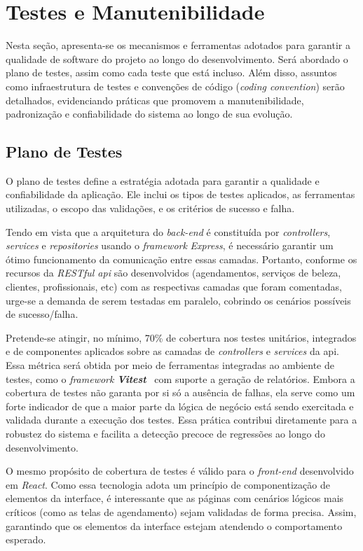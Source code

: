 \section{Testes e Manutenibilidade}
Nesta seção, apresenta-se os mecanismos e ferramentas adotados para garantir a qualidade de software do projeto ao longo do desenvolvimento.
Será abordado o plano de testes, assim como cada teste que está incluso. Além disso, assuntos como infraestrutura de testes e convenções de código (\textit{coding convention})
serão detalhados, evidenciando práticas que promovem a manutenibilidade, padronização e confiabilidade do sistema ao longo de sua evolução.

\subsection{Plano de Testes}
O plano de testes define a estratégia adotada para garantir a qualidade e confiabilidade da aplicação. 
Ele inclui os tipos de testes aplicados, as ferramentas utilizadas, o escopo das validações, e os critérios de sucesso e falha.

Tendo em vista que a arquitetura do \textit{back-end} é constituída por \textit{controllers}, \textit{services} e \textit{repositories} usando o \emph{framework} \textit{Express}, 
é necessário garantir um ótimo funcionamento da comunicação entre essas camadas. Portanto, conforme os recursos da \textit{RESTful \gls{api}} são desenvolvidos (agendamentos, serviços de beleza, clientes, profissionais, etc) com as respectivas camadas que foram comentadas, urge-se a demanda de serem testadas em paralelo, cobrindo os cenários possíveis de sucesso/falha. 

Pretende-se atingir, no mínimo, 70\% de cobertura nos testes unitários, integrados e de componentes aplicados sobre as camadas de \textit{controllers} e \textit{services} da \gls{api}. Essa métrica será obtida por meio de ferramentas integradas ao ambiente de testes, como o \textit{framework} \textbf{\textit{Vitest}}~\cite{vitest-2025} com suporte a geração de relatórios. Embora a cobertura de testes não garanta por si só a ausência de falhas, ela serve como um forte indicador de que a maior parte da lógica de negócio está sendo exercitada e validada durante a execução dos testes. Essa prática contribui diretamente para a robustez do sistema e facilita a detecção precoce de regressões ao longo do desenvolvimento.

O mesmo propósito de cobertura de testes é válido para o \textit{front-end} desenvolvido em \textit{React}. Como essa tecnologia adota um princípio de componentização de elementos da interface, é interessante que as páginas com cenários lógicos mais críticos (como as telas de agendamento) sejam validadas de forma precisa. Assim, garantindo que os elementos da interface estejam atendendo o comportamento esperado.

